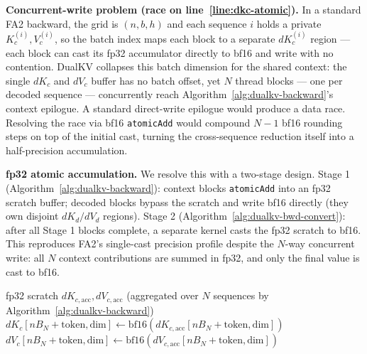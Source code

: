 \documentclass{article}
\begin{document}
\textbf{Concurrent-write problem (race on line~\ref{line:dkc-atomic}).} In a standard FA2 backward, the grid is $(n, b, h)$ and each sequence $i$ holds a private $K_c^{(i)}, V_c^{(i)}$, so the batch index maps each block to a separate $dK_c^{(i)}$ region --- each block can cast its fp32 accumulator directly to bf16 and write with no contention. DualKV collapses this batch dimension for the shared context: the single $dK_c$ and $dV_c$ buffer has no batch offset, yet $N$ thread blocks --- one per decoded sequence --- concurrently reach Algorithm~\ref{alg:dualkv-backward}'s context epilogue. A standard direct-write epilogue would produce a data race. Resolving the race via bf16 \texttt{atomicAdd} would compound $N{-}1$ bf16 rounding steps on top of the initial cast, turning the cross-sequence reduction itself into a half-precision accumulation.

\textbf{fp32 atomic accumulation.} We resolve this with a two-stage design. Stage 1 (Algorithm~\ref{alg:dualkv-backward}): context blocks \texttt{atomicAdd} into an fp32 scratch buffer; decoded blocks bypass the scratch and write bf16 directly (they own disjoint $dK_d/dV_d$ regions). Stage 2 (Algorithm~\ref{alg:dualkv-bwd-convert}): after all Stage 1 blocks complete, a separate kernel casts the fp32 scratch to bf16. This reproduces FA2's single-cast precision profile despite the $N$-way concurrent write: all $N$ context contributions are summed in fp32, and only the final value is cast to bf16.

\begin{algorithm}[H]
\small
\caption{\texttt{convert\_dkv\_context}: fp32-to-bf16 cast, launched on grid $(n_{\text{ctx}},\; 1,\; H)$ after Algorithm~\ref{alg:dualkv-backward} completes (batch dimension collapsed because context is shared)}
\label{alg:dualkv-bwd-convert}
\begin{algorithmic}[1]
\Require fp32 scratch $dK_{c,\text{acc}}, dV_{c,\text{acc}}$ (aggregated over $N$ sequences by Algorithm~\ref{alg:dualkv-backward})
    \State $dK_c[n B_N{+}\text{token}, \text{dim}] \gets \text{bf16}(dK_{c,\text{acc}}[n B_N{+}\text{token}, \text{dim}])$
    \State $dV_c[n B_N{+}\text{token}, \text{dim}] \gets \text{bf16}(dV_{c,\text{acc}}[n B_N{+}\text{token}, \text{dim}])$
\EndFor
\end{algorithmic}
\end{algorithm}
\vspace{-1em}
\end{document}
